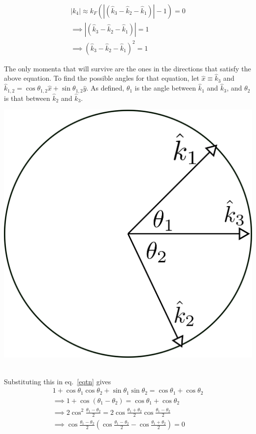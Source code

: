 \documentclass[14pt]{extarticle}
\begin{document}
\begin{gather}
	|k_4| \approx k_F\left(\left|\left(\hat k_3 - \hat k_2 - \hat k_1\right)\right| - 1\right)=0\\
		\implies \left|\left(\hat k_3 - \hat k_2 - \hat k_1\right)\right| = 1\\
		\implies \left(\hat k_3 - \hat k_2 - \hat k_1\right)^2 = 1\label{eqtn}
\end{gather}
\begin{minipage}{300pt}
	The only momenta that will survive are the ones in the directions that satisfy the above equation. To find the possible angles for that equation, let \(\hat x \equiv \hat k_3\) and \(\hat k_{1,2} = \cos \theta_{1,2}\hat x + \sin\theta_{1,2}\hat y\). As defined, \(\theta_1\) is the angle between \(\hat k_1\) and \(\hat k_3\), and \(\theta_2\) is that between \(\hat k_2\) and \(\hat k_3\). 
\end{minipage}
\begin{minipage}{200pt}
	\begin{center}\includegraphics[scale=0.2]{./figures/term2.png}\end{center}
\end{minipage}\\
Substituting this in eq.~\ref{eqtn} gives
\begin{gather}
 1 + \cos\theta_1\cos\theta_2 + \sin\theta_1\sin\theta_2= \cos\theta_1 + \cos\theta_2\\
 \implies  1 + \cos\left(\theta_1 - \theta_2\right) = \cos\theta_1 + \cos\theta_2\\
\implies  2\cos^2\frac{\theta_1 - \theta_2}{2} = 2\cos\frac{\theta_1 + \theta_2}{2}\cos\frac{\theta_1 - \theta_2}{2}\\
\implies  \cos\frac{\theta_1 - \theta_2}{2}\left(\cos\frac{\theta_1 - \theta_2}{2} - \cos\frac{\theta_1 + \theta_2}{2}\right) =0
\end{gather}
\end{document}
